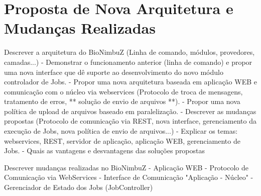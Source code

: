 
\chapter{Proposta de Nova Arquitetura e Mudanças Realizadas} \label{cap4}

Descrever a arquitetura do BioNimbuZ (Linha de comando, módulos, provedores, camadas...)
-	Demonstrar o funcionamento anterior (linha de comando) e propor uma nova interface que dê suporte ao desenvolvimento do novo módulo controlador de Jobs.
-	Propor uma nova arquitetura baseada em aplicação WEB e comunicação com o núcleo via webservices (Protocolo de troca de mensagens, tratamento de erros, ** solução de envio de arquivos **).
-	Propor uma nova política de upload de arquivos baseado em paralelização.
-	Descrever as mudanças propostas (Protocolo de comunicação via REST, nova interface, gerenciamento da execução de Jobs, nova política de envio de arquivos...)
-	Explicar os temas: webservices, REST, servidor de aplicação, aplicação WEB, gerenciamento de Jobs.
-	Quais as vantagens e desvantagens das soluções propostas

Descrever mudanças realizadas no BioNimbuZ
-	Aplicação WEB
-	Protocolo de Comunicação via WebServices
-	Interface de Comunicação "Aplicação - Núcleo"
-	Gerenciador de Estado dos Jobs (JobController)
